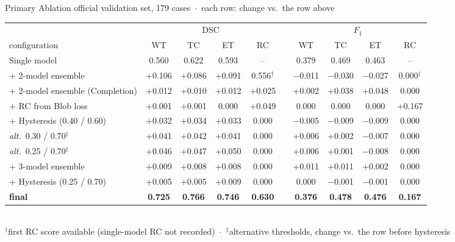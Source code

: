 \documentclass[aspectratio=169,11pt]{beamer}
\newcommand{\up}[1]{\textcolor{upgreen}{+#1}}
\newcommand{\dn}[1]{\textcolor{kclred}{$-$#1}}
\begin{document}
\begin{frame}{Primary Ablation}
\centering
{\scriptsize\color{black!60}official validation set, 179 cases \,$\cdot$\, each row: change vs.\ the row above}\\[0.5em]
\scriptsize
\renewcommand{\arraystretch}{1.25}
\setlength{\tabcolsep}{3.2pt}
\begin{tabular}{@{}l cccc c cccc@{}}
\toprule
 & \multicolumn{4}{c}{DSC} & & \multicolumn{4}{c}{$F_1$} \\
\cmidrule(lr){2-5}\cmidrule(lr){7-10}
configuration & WT & TC & ET & RC & & WT & TC & ET & RC \\
\midrule
Single model & 0.560 & 0.622 & 0.593 & -- &  & 0.379 & 0.469 & 0.463 & --  \\
+ 2-model ensemble & \up{0.106} & \up{0.086} & \up{0.091} & 0.556$^\dagger$ &  & \dn{0.011} & \dn{0.030} & \dn{0.027} & 0.000$^\dagger$  \\
+ 2-model ensemble (Completion) & \up{0.012} & \up{0.010} & \up{0.012} & \up{0.025} &  & \up{0.002} & \up{0.038} & \up{0.048} & {\color{black!50}0.000}  \\
+ RC from Blob loss & \up{0.001} & \up{0.001} & {\color{black!50}0.000} & \up{0.049} &  & {\color{black!50}0.000} & {\color{black!50}0.000} & {\color{black!50}0.000} & \up{0.167}  \\
+ Hysteresis (0.40 / 0.60) & \up{0.032} & \up{0.034} & \up{0.033} & {\color{black!50}0.000} &  & \dn{0.005} & \dn{0.009} & \dn{0.009} & {\color{black!50}0.000}  \\
{\color{black!60}\quad\emph{alt.}\ 0.30 / 0.70$^\ddagger$} & \up{0.041} & \up{0.042} & \up{0.041} & {\color{black!50}0.000} &  & \up{0.006} & \up{0.002} & \dn{0.007} & {\color{black!50}0.000}  \\
{\color{black!60}\quad\emph{alt.}\ 0.25 / 0.70$^\ddagger$} & \up{0.046} & \up{0.047} & \up{0.050} & {\color{black!50}0.000} &  & \up{0.006} & \up{0.001} & \dn{0.008} & {\color{black!50}0.000}  \\
+ 3-model ensemble & \up{0.009} & \up{0.008} & \up{0.008} & {\color{black!50}0.000} &  & \up{0.011} & \up{0.011} & \up{0.002} & {\color{black!50}0.000}  \\
+ Hysteresis (0.25 / 0.70) & \up{0.005} & \up{0.005} & \up{0.009} & {\color{black!50}0.000} &  & {\color{black!50}0.000} & \dn{0.001} & \dn{0.001} & {\color{black!50}0.000}  \\
\midrule
\textbf{final} & \textbf{0.725} & \textbf{0.766} & \textbf{0.746} & \textbf{0.630} &  & \textbf{0.376} & \textbf{0.478} & \textbf{0.476} & \textbf{0.167} \\
\bottomrule
\end{tabular}\\[0.4em]
{\tiny\color{black!60}$^\dagger$first RC score available (single-model RC not recorded) \,$\cdot$\, $^\ddagger$alternative thresholds, change vs.\ the row before hysteresis}
\end{frame}
\end{document}
